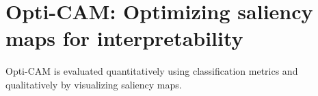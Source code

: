 \chapter{Opti-CAM: Optimizing saliency maps for interpretability}
\chaptertoc{}
\label{ch:opticam}



Opti-CAM is evaluated quantitatively using classification metrics and qualitatively by visualizing
 saliency maps.





